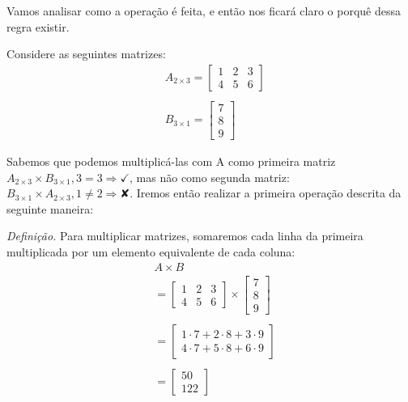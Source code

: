 \documentclass[
  letterpaper,
  DIV=11,
  numbers=noendperiod]{scrreprt}
\begin{document}
Vamos analisar como a operação é feita, e então nos ficará claro o
porquê dessa regra existir.

Considere as seguintes matrizes: \[
\begin{aligned}
    &A_{2\times 3} =
    \begin{bmatrix}
        1 & 2 & 3 \\
        4 & 5 & 6
    \end{bmatrix} \\ \\
    &B_{3\times 1} = 
    \begin{bmatrix}
        7 \\
        8 \\
        9
    \end{bmatrix}
\end{aligned}
\]

Sabemos que podemos multiplicá-las com A como primeira matriz
\(A_{2\times 3}\times B_{3\times 1}, 3=3\Rightarrow \checkmark\), mas
não como segunda matriz:
\(B_{3\times 1} \times A_{2\times 3}, 1\neq 2 \Rightarrow ✘\). Iremos
então realizar a primeira operação descrita da seguinte maneira:

\emph{Definição.} Para multiplicar matrizes, somaremos cada linha da
primeira multiplicada por um elemento equivalente de cada coluna: \[
\begin{aligned}
    &A \times B \\
    &=
    \begin{bmatrix}
        1 & 2 & 3 \\
        4 & 5 & 6
    \end{bmatrix}
    \times 
    \begin{bmatrix}
        7 \\
        8 \\
        9
    \end{bmatrix}\\ \\
    &=
    \begin{bmatrix}
        1 \cdot 7 + 2 \cdot 8 + 3 \cdot 9 \\
        4 \cdot 7 + 5 \cdot 8 + 6 \cdot 9
    \end{bmatrix} \\ \\
    &=
    \begin{bmatrix}
        50 \\
        122
    \end{bmatrix}
\end{aligned}
\]
\end{document}
